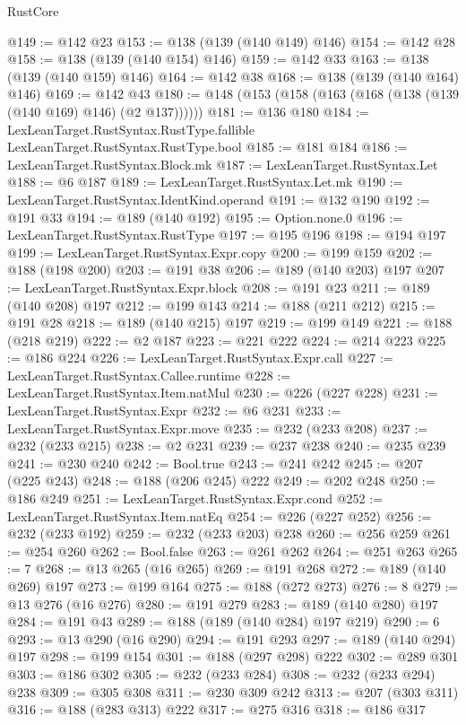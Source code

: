 \begin{lexlean}{RustCore}
\begin{coremodule}
@149 := @142 @23
@153 := @138 (@139 (@140 @149) @146)
@154 := @142 @28
@158 := @138 (@139 (@140 @154) @146)
@159 := @142 @33
@163 := @138 (@139 (@140 @159) @146)
@164 := @142 @38
@168 := @138 (@139 (@140 @164) @146)
@169 := @142 @43
@180 := @148 (@153 (@158 (@163 (@168 (@138 (@139 (@140 @169) @146) (@2 @137))))))
@181 := @136 @180
@184 := LexLeanTarget.RustSyntax.RustType.fallible LexLeanTarget.RustSyntax.RustType.bool
@185 := @181 @184
@186 := LexLeanTarget.RustSyntax.Block.mk
@187 := LexLeanTarget.RustSyntax.Let
@188 := @6 @187
@189 := LexLeanTarget.RustSyntax.Let.mk
@190 := LexLeanTarget.RustSyntax.IdentKind.operand
@191 := @132 @190
@192 := @191 @33
@194 := @189 (@140 @192)
@195 := Option.none.{0}
@196 := LexLeanTarget.RustSyntax.RustType
@197 := @195 @196
@198 := @194 @197
@199 := LexLeanTarget.RustSyntax.Expr.copy
@200 := @199 @159
@202 := @188 (@198 @200)
@203 := @191 @38
@206 := @189 (@140 @203) @197
@207 := LexLeanTarget.RustSyntax.Expr.block
@208 := @191 @23
@211 := @189 (@140 @208) @197
@212 := @199 @143
@214 := @188 (@211 @212)
@215 := @191 @28
@218 := @189 (@140 @215) @197
@219 := @199 @149
@221 := @188 (@218 @219)
@222 := @2 @187
@223 := @221 @222
@224 := @214 @223
@225 := @186 @224
@226 := LexLeanTarget.RustSyntax.Expr.call
@227 := LexLeanTarget.RustSyntax.Callee.runtime
@228 := LexLeanTarget.RustSyntax.Item.natMul
@230 := @226 (@227 @228)
@231 := LexLeanTarget.RustSyntax.Expr
@232 := @6 @231
@233 := LexLeanTarget.RustSyntax.Expr.move
@235 := @232 (@233 @208)
@237 := @232 (@233 @215)
@238 := @2 @231
@239 := @237 @238
@240 := @235 @239
@241 := @230 @240
@242 := Bool.true
@243 := @241 @242
@245 := @207 (@225 @243)
@248 := @188 (@206 @245) @222
@249 := @202 @248
@250 := @186 @249
@251 := LexLeanTarget.RustSyntax.Expr.cond
@252 := LexLeanTarget.RustSyntax.Item.natEq
@254 := @226 (@227 @252)
@256 := @232 (@233 @192)
@259 := @232 (@233 @203) @238
@260 := @256 @259
@261 := @254 @260
@262 := Bool.false
@263 := @261 @262
@264 := @251 @263
@265 := 7
@268 := @13 @265 (@16 @265)
@269 := @191 @268
@272 := @189 (@140 @269) @197
@273 := @199 @164
@275 := @188 (@272 @273)
@276 := 8
@279 := @13 @276 (@16 @276)
@280 := @191 @279
@283 := @189 (@140 @280) @197
@284 := @191 @43
@289 := @188 (@189 (@140 @284) @197 @219)
@290 := 6
@293 := @13 @290 (@16 @290)
@294 := @191 @293
@297 := @189 (@140 @294) @197
@298 := @199 @154
@301 := @188 (@297 @298) @222
@302 := @289 @301
@303 := @186 @302
@305 := @232 (@233 @284)
@308 := @232 (@233 @294) @238
@309 := @305 @308
@311 := @230 @309 @242
@313 := @207 (@303 @311)
@316 := @188 (@283 @313) @222
@317 := @275 @316
@318 := @186 @317

\end{coremodule}
\end{lexlean}
